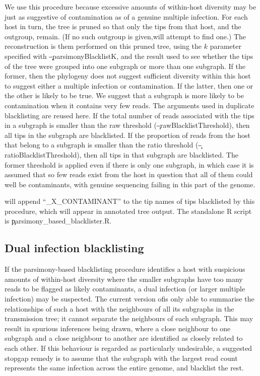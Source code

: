We use this procedure because excessive amounts of within-host diversity may be just as suggestive of contamination as of a genuine multiple infection.
For each host in turn, the tree is pruned so that only the tips from that host, and the outgroup, remain.
(If no such outgroup is given,\break \pat will attempt to find one.) The reconstruction is them performed on this pruned tree, using the $k$ parameter specified with \c{--parsimonyBlacklistK}, and the result used to see whether the tips of the tree were grouped into one subgraph or more than one subgraph.
If the former, then the phylogeny does not suggest sufficient diversity within this host to suggest either a multiple infection or contamination.
If the latter, then one or the other is likely to be true.
We suggest that a subgraph is more likely to be contamination when it contains very few reads.
The arguments used in duplicate blacklisting are reused here.
If the total number of reads associated with the tips in a subgraph is smaller than the raw threshold (\c{--rawBlacklistThreshold}), then all tips in the subgraph are blacklisted.
If the proportion of reads from the host that belong to a subgraph is smaller than the ratio threshold (\c{--ratioBlacklistThreshold}), then all tips in that subgraph are blacklisted.
The former threshold is applied even if there is only one subgraph, in which case it is assumed that so few reads exist from the host in question that all of them could well be contaminants, with genuine sequencing failing in this part of the genome.

\pat will append ``\_X\_CONTAMINANT'' to the tip names of tips blacklisted by this procedure, which will appear in annotated tree output.
The standalone R script is \c{parsimony\_based\_blacklister.R}.

\subsection{Dual infection blacklisting}

If the parsimony-based blacklisting procedure identifies a host with suspicious amounts of within-host diversity where the smaller subgraphs have too many reads to be flagged as likely contaminants, a dual infection (or larger multiple infection) may be suspected.
The current version of\break \pat is only able to summarise the relationships of such a host with the neighbours of all its subgraphs in the transmission tree; it cannot separate the neighbours of each subgraph.
This may result in spurious inferences being drawn, where a close neighbour to one subgraph and a close neighbour to another are identified as closely related to each other.
If this behaviour is regarded as particularly undesirable, a suggested stopgap remedy is to assume that the subgraph with the largest read count represents the same infection across the entire genome, and blacklist the rest.

